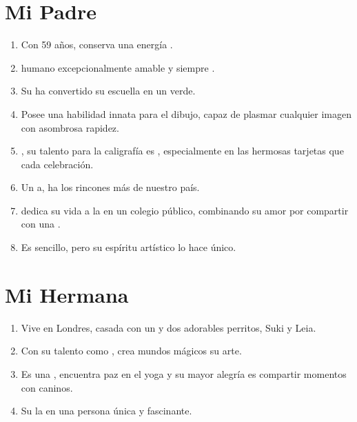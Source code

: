 \documentclass[grid,avery5371]{article}
\begin{document}
\section{Mi Padre}
\begin{enumerate}
\item Con 59 años, conserva una energía .
\item {} humano excepcionalmente amable y siempre . 
\item Su  ha convertido su escuella en un  verde.
\item Posee una habilidad innata para el dibujo, capaz de plasmar cualquier imagen con asombrosa rapidez.
\item {}, su talento para la caligrafía es , especialmente en las hermosas tarjetas que  cada celebración.
\item Un a, ha  los rincones más  de nuestro país.
\item {} dedica su vida a la  en un colegio público, combinando su amor por compartir  con una .
\item Es sencillo, pero su espíritu artístico lo hace único.
\end{enumerate}

\section{Mi Hermana}
\begin{enumerate}
\item Vive en  Londres, casada con un  y  dos adorables perritos, Suki y Leia.
\item Con su talento como , crea mundos mágicos  su arte.
\item Es una , encuentra paz en el yoga y su mayor alegría es compartir momentos con  caninos.
\item Su  la  en una persona única y fascinante.
\end{enumerate}
\end{document}
